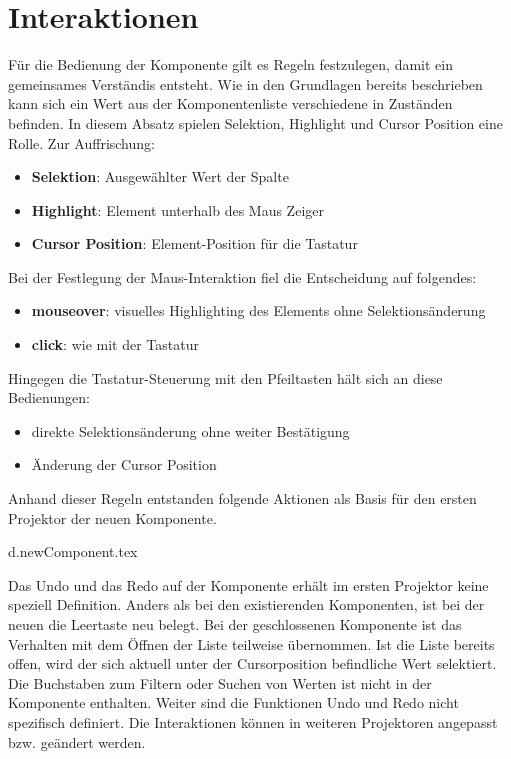 \section{Interaktionen}

Für die Bedienung der Komponente gilt es Regeln festzulegen, damit ein gemeinsames Verständis entsteht.
Wie in den Grundlagen bereits beschrieben kann sich ein Wert aus der Komponentenliste verschiedene in Zuständen befinden.
In diesem Absatz spielen Selektion, Highlight und Cursor Position eine Rolle.
Zur Auffrischung: 

\begin{itemize}
    \item \textbf{Selektion}: Ausgewählter Wert der Spalte
    \item \textbf{Highlight}: Element unterhalb des Maus Zeiger
    \item \textbf{Cursor Position}: Element-Position für die Tastatur
\end{itemize}

\noindent
Bei der Festlegung der Maus-Interaktion fiel die Entscheidung auf folgendes:

\begin{itemize}
    \item \textbf{mouseover}: visuelles Highlighting des Elements ohne Selektionsänderung
    \item \textbf{click}: wie mit der Tastatur
\end{itemize}

\noindent
Hingegen die Tastatur-Steuerung mit den Pfeiltasten hält sich an diese Bedienungen:

\begin{itemize}
    \item direkte Selektionsänderung ohne weiter Bestätigung
    \item Änderung der Cursor Position
\end{itemize}

\noindent
Anhand dieser Regeln entstanden folgende Aktionen als Basis für den ersten Projektor der neuen Komponente. 


\clearpage
{d.newComponent.tex}

Das Undo und das Redo auf der Komponente erhält im ersten Projektor keine speziell Definition.
Anders als bei den existierenden Komponenten, ist bei der neuen die Leertaste neu belegt. 
Bei der geschlossenen Komponente ist das Verhalten mit dem Öffnen der Liste teilweise übernommen.
Ist die Liste bereits offen, wird der sich aktuell unter der Cursorposition befindliche Wert selektiert.
Die Buchstaben zum Filtern oder Suchen von Werten ist nicht in der Komponente enthalten.
Weiter sind die Funktionen Undo und Redo nicht spezifisch definiert.
Die Interaktionen können in weiteren Projektoren angepasst bzw. geändert werden.



